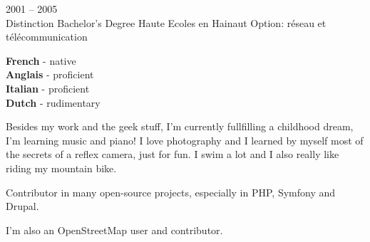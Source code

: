 \begin{entrylist}
	\entry
		{2001 -- 2005\\\footnotesize{Distinction}}
		{Bachelor's Degree}
		{Haute Ecoles en Hainaut}
		{Option: réseau et télécommunication}
\end{entrylist}


\begin{minipage}[t]{.2\textwidth}
	\vspace{-\baselineskip} %


	\textbf{French} - native\\
	\textbf{Anglais} - proficient\\
	\textbf{Italian} - proficient\\
	\textbf{Dutch} - rudimentary\\
\end{minipage}
\hfill
\begin{minipage}[t]{.45\textwidth}
	\vspace{-\baselineskip} %


    Besides my work and the geek stuff, I’m currently fullfilling a childhood dream, I’m learning music and piano!
    I love photography and I learned by myself most of the secrets of a reflex camera, just for fun.
    I swim a lot and I also really like riding my mountain bike.
\end{minipage}
\hfill
\begin{minipage}[t]{.30\textwidth}
	\vspace{-\baselineskip} %


    Contributor in many open-source projects, especially in PHP, Symfony and Drupal.

    I'm also an OpenStreetMap user and contributor.
\end{minipage}
\hfill
